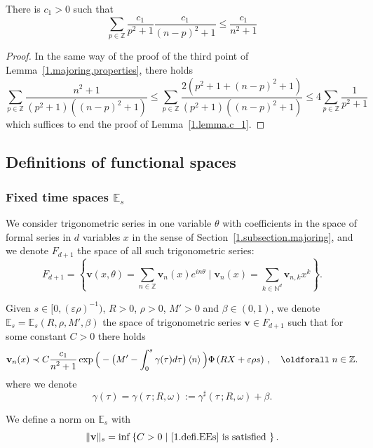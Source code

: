 \documentclass[AHL,Unicode,longabstracts,published]{cedram}
\theoremstyle{plain}
\newcommand*\e{\varepsilon}
\newcommand*\N{{\mathbb N}}
\newcommand*\Z{{\mathbb Z}}
\newcommand*\EE{{\mathbb E}}
\newcommand*\g{\gamma}
\newcommand{\vbf}{{\mathbf v}}
\newcommand*\dsp{\displaystyle}
\renewcommand*{\forall}{\mathrel{\oldforall}}
\begin{document}
\begin{lemm}\label{1.lemma.c_1}
There is $c_1>0$ such that
\begin{equation}\label{1.definition.c_1}
\sum_{p\in\mathbb{Z}} \frac{\displaystyle c_1}{\displaystyle p^2+1} \frac{\displaystyle c_1}{\displaystyle (n-p)^2+1} \leq \frac{\displaystyle c_1}{\displaystyle n^2+1}
\end{equation}
\end{lemm}

\begin{proof}
In the same way of the proof of the third point of Lemma~\ref{1.majoring.properties}, there holds
\[
\sum_{p\in\mathbb{Z}} \frac{\displaystyle n^2+1}{\displaystyle (p^2+1)((n-p)^2+1)} \leq \sum_{p\in\mathbb{Z}} \frac{\displaystyle 2(p^2+1 + (n-p)^2 +1)}{\displaystyle (p^2+1)((n-p)^2+1)} \leq 4 \sum_{p\in\Z} \frac{\dsp 1}{\dsp p^2+1}
\]
which suffices to end the proof of Lemma~\ref{1.lemma.c_1}.
\end{proof}



\subsection{Definitions of functional spaces}



\subsubsection{Fixed time spaces \texorpdfstring{$\EE_{s}$}{EEs}}


We consider trigonometric series in one variable $\theta$ with coefficients in the space of formal series in $d$ variables $x$ in the sense of Section~\ref{1.subsection.majoring}, and we denote $F_{d+1}$ the space of all such trigonometric series:
\[
F_{d+1} = \left\{ \vbf(x,\theta) = \sum_{n\in\mathbb{Z}} \vbf_n(x) e^{in\theta} \;\Big|\; \vbf_n(x) = \sum_{k\in\N^{d}} \vbf_{n,k} x^{k} \right\}.
\]

\begin{defi}[Fixed time spaces $\EE_{s}$]\label{1.definition.EE_s}
Given $s\in[0,(\e \rho)^{-1})$, $R>0$, $\rho >0$, $M'>0$ and $\beta \in (0,1)$, we denote $\EE_{s} = \EE_{s}(R,\rho,M',\beta)$ the space of trigonometric series $\vbf\in F_{d+1}$ such that for some constant $C>0$ there holds
\begin{equation}\label{1.defi.EEs}
\vbf_n(x) \prec C\frac{\displaystyle c_1}{\displaystyle n^2+1}\exp\Big({}-\big(M' - \int_{0}^{s} \g(\tau)d\tau \big)\left< n \right>\Big) \Phi\left(R X+\e\rho s\right)\,,\quad \forall n \in\Z.
\end{equation}
where we denote
\begin{equation}\label{1.def.g}
\g(\tau) = \g(\tau \,;R,\omega) := \g^{\sharp}(\tau \, ; R,\omega) + \beta.
\end{equation}

We define a norm on $\EE_{s}$ with
\begin{equation}\label{1.defi.norm.s}
\|\vbf\|_{s} = \inf \left\{ C>0 \;|\text{~\eqref{1.defi.EEs}} \text{ is satisfied } \right\}.
\end{equation}
\end{defi}
\end{document}
